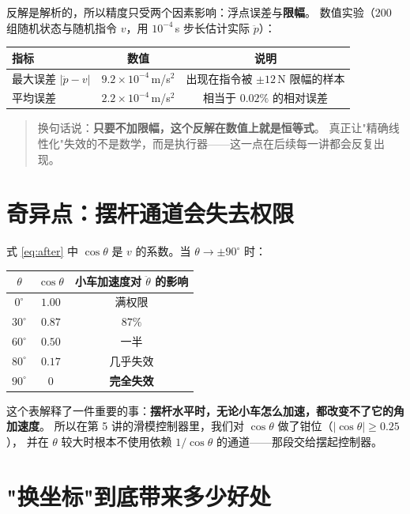 反解是解析的，所以精度只受两个因素影响：浮点误差与\textbf{限幅}。
数值实验（$200$ 组随机状态与随机指令 $v$，用 $10^{-4}$\,s 步长估计实际 $\ddot p$）：

\begin{center}
\small
\begin{tabular}{@{}lcc@{}}
\toprule
指标 & 数值 & 说明 \\
\midrule
最大误差 $|\ddot p - v|$ & $9.2\times10^{-4}$\,m/s$^2$ & 出现在指令被 $\pm12$\,N 限幅的样本 \\
平均误差 & $2.2\times10^{-4}$\,m/s$^2$ & 相当于 $0.02\%$ 的相对误差 \\
\bottomrule
\end{tabular}
\end{center}

\begin{quote}
换句话说：\textbf{只要不加限幅，这个反解在数值上就是恒等式}。
真正让"精确线性化"失效的不是数学，而是执行器——这一点在后续每一讲都会反复出现。
\end{quote}

\section{奇异点：摆杆通道会失去权限}

式 \eqref{eq:after} 中 $\cos\theta$ 是 $v$ 的系数。当 $\theta\to\pm90^\circ$ 时：

\begin{center}
\small
\begin{tabular}{@{}ccc@{}}
\toprule
$\theta$ & $\cos\theta$ & 小车加速度对 $\ddot\theta$ 的影响 \\
\midrule
$0^\circ$ & $1.00$ & 满权限 \\
$30^\circ$ & $0.87$ & $87\%$ \\
$60^\circ$ & $0.50$ & 一半 \\
$80^\circ$ & $0.17$ & 几乎失效 \\
$90^\circ$ & $0$ & \textbf{完全失效} \\
\bottomrule
\end{tabular}
\end{center}

这个表解释了一件重要的事：\textbf{摆杆水平时，无论小车怎么加速，都改变不了它的角加速度}。
所以在第 5 讲的滑模控制器里，我们对 $\cos\theta$ 做了钳位（$|\cos\theta|\ge0.25$），
并在 $\theta$ 较大时根本不使用依赖 $1/\cos\theta$ 的通道——那段交给摆起控制器。

\section{"换坐标"到底带来多少好处}

